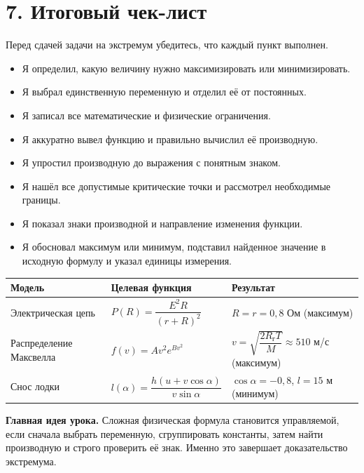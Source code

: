 \documentclass[a4paper,12pt]{article}
\newcommand{\sectionrule}{\par\vspace{2pt}{\color{accent}\rule{\linewidth}{0.6pt}}\vspace{4pt}}
\newcommand{\lessonsection}[1]{\section*{\color{accent}#1}\sectionrule}
\newcommand{\lessonstep}[1]{\par\vspace{5pt}{\color{accent}\bfseries #1}\par\vspace{-3pt}}
\begin{document}
\lessonsection{7. Итоговый чек-лист}
Перед сдачей задачи на экстремум убедитесь, что каждый пункт выполнен.
\begin{itemize}[label=$\square$,itemsep=8pt]
\item Я определил, какую величину нужно максимизировать или минимизировать.
\item Я выбрал единственную переменную и отделил её от постоянных.
\item Я записал все математические и физические ограничения.
\item Я аккуратно вывел функцию и правильно вычислил её производную.
\item Я упростил производную до выражения с понятным знаком.
\item Я нашёл все допустимые критические точки и рассмотрел необходимые границы.
\item Я показал знаки производной и направление изменения функции.
\item Я обосновал максимум или минимум, подставил найденное значение в исходную формулу и указал единицы измерения.
\end{itemize}

\vspace{5mm}
\lessonstep{Сводка трёх моделей}
\renewcommand{\arraystretch}{1.45}
\begin{tabularx}{\linewidth}{@{}p{.26\linewidth}X p{.31\linewidth}@{}}
\toprule
Модель & Целевая функция & Результат\\
\midrule
Электрическая цепь & $P(R)=\dfrac{E^2R}{(r+R)^2}$ & $R=r=0{,}8$ Ом (максимум)\\[3pt]
Распределение Максвелла & $f(v)=Av^2e^{Bv^2}$ & $v=\sqrt{\dfrac{2R_{\text{г}}T}{M}}\approx510$ м/с (максимум)\\[3pt]
Снос лодки & $l(\alpha)=\dfrac{h(u+v\cos\alpha)}{v\sin\alpha}$ & $\cos\alpha=-0{,}8$, $l=15$ м (минимум)\\
\bottomrule
\end{tabularx}

\vspace{8mm}
\textbf{Главная идея урока.} Сложная физическая формула становится управляемой, если сначала выбрать переменную, сгруппировать константы, затем найти производную и строго проверить её знак. Именно это завершает доказательство экстремума.
\end{document}
